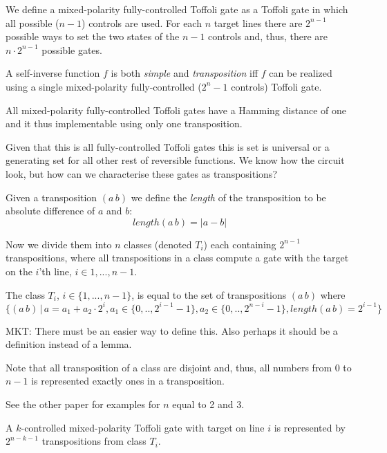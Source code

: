 \medskip {}\enspace We define a mixed-polarity fully-controlled Toffoli gate as a Toffoli gate in which all possible ($n - 1$) controls are used. For each $n$ target lines there are $2^{n-1}$ possible ways to set the two states of the $n-1$ controls and, thus, there are $n \cdot 2^{n-1}$ possible gates.

\smallskip {} A self-inverse function $f$ is both {\it simple\/} and {\it transposition\/} iff $f$ can be realized using a single mixed-polarity fully-controlled ($2^n-1$ controls) Toffoli gate.

\smallskip{} All mixed-polarity fully-controlled Toffoli gates have a Hamming distance of one and it thus implementable using only one transposition. \qquad\slug

Given that this is all fully-controlled Toffoli gates this is set is universal or a generating set for all other rest of reversible functions. We know how the circuit look, but how can we characterise these gates as transpositions?

\smallskip {} Given a transposition $(a\,b)$ we define the {\it length} of the transposition to be absolute difference of $a$ and $b$:
$$
length (a\,b) = |a - b|
$$

Now we divide them into $n$ classes (denoted $T_i$) each containing $2^{n-1}$ transpositions, where all transpositions in a class compute a gate with the target on the $i$'th line, $i \in {1,...,n-1}$.

\smallskip {} The class $T_i$, $i \in \{1,...,n-1\}$, is equal to the set of transpositions $(a\,b)$ where 
$$
\{(a\,b) \,|\, a = a_1 + a_2 \cdot 2^i, a_1 \in \{0,..,2^{i-1}-1\}, a_2 \in \{0,..,2^{n-i}-1\}, length (a\,b) = 2^{i-1} \}
$$

\smallskip{} MKT: There must be an easier way to define this. Also perhaps it should be a definition instead of a lemma.\qquad\slug

Note that all transposition of a class are disjoint and, thus, all numbers from 0 to $n-1$ is represented exactly ones in a transposition.

\smallskip{} See the other paper for examples for $n$ equal to 2 and 3. 

\smallskip {} A $k$-controlled mixed-polarity Toffoli gate with target on line $i$ is represented by $2^{n-k-1}$ transpositions from class $T_i$.

